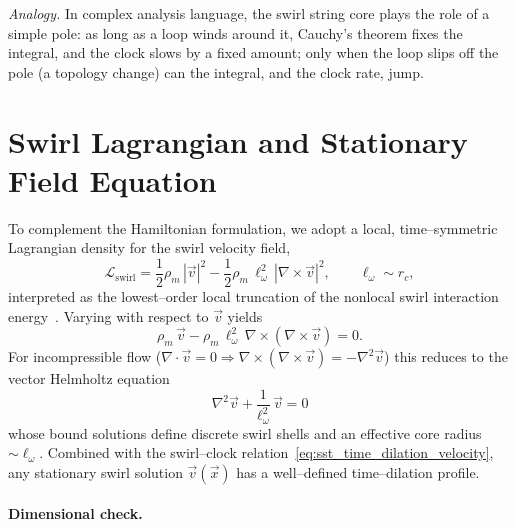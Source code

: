 \documentclass[11pt]{article}
\newcommand{\rhoM}{\rho_{\!m}}   %
\newcommand{\rc}{r_c}                                    %
\begin{document}
        \medskip
        \noindent\emph{Analogy.} In complex analysis language, the swirl string core plays the role of a simple pole: as long as a loop winds around it, Cauchy’s theorem fixes the integral, and the clock slows by a fixed amount; only when the loop slips off the pole (a topology change) can the integral, and the clock rate, jump.

    \section{Swirl Lagrangian and Stationary Field Equation}
    \label{sec:sst_lagrangian_swirl}

    To complement the Hamiltonian formulation, we adopt a local, time–symmetric Lagrangian density for the swirl velocity field,
    \begin{equation}
        \mathcal{L}_{\text{swirl}}
        =
        \frac{1}{2}\rhoM\,|\vec{v}|^{2}
        -\frac{1}{2}\rhoM\,\ell_\omega^{2}\,|\nabla\times\vec{v}|^{2},
        \qquad
        \ell_\omega\sim\rc,
        \label{eq:sst_L_swirl}
    \end{equation}
    interpreted as the lowest–order local truncation of the nonlocal swirl interaction energy~\cite{Saffman1992,ChorinMarsden1993}. Varying with respect to \(\vec{v}\) yields
    \begin{equation}
        \rhoM\,\vec{v}
        -\rhoM\,\ell_\omega^{2}\,\nabla\times(\nabla\times\vec{v})
        =0.
    \end{equation}
    For incompressible flow (\(\nabla\!\cdot\!\vec{v}=0\Rightarrow \nabla\times(\nabla\times\vec{v})=-\nabla^2\vec{v}\)) this reduces to the vector Helmholtz equation
    \begin{equation}
        \boxed{
            \nabla^{2}\vec{v}
            +\frac{1}{\ell_\omega^{2}}\,\vec{v}
            =0
        }
        \label{eq:sst_Helmholtz_v}
    \end{equation}
    whose bound solutions define discrete swirl shells and an effective core radius \(\sim \ell_\omega\). Combined with the swirl–clock relation~\eqref{eq:sst_time_dilation_velocity}, any stationary swirl solution \(\vec{v}(\vec{x})\) has a well–defined time–dilation profile.

    \paragraph{Dimensional check.}
\end{document}
